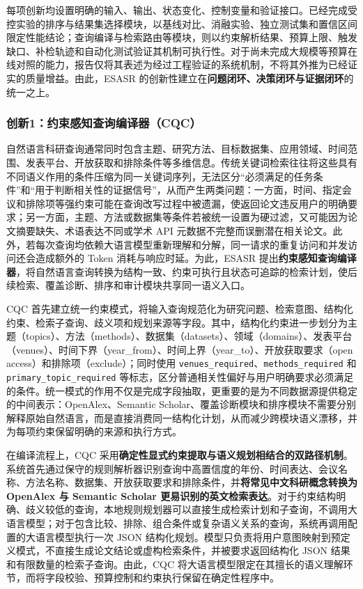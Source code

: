 \documentclass[a4paper,12pt,fontset=none]{ctexart}
\begin{document}
每项创新均设置明确的输入、输出、状态变化、控制变量和验证接口。已经完成受控实验的排序与结果集选择模块，以基线对比、消融实验、独立测试集和置信区间限定性能结论；查询编译与检索路由等模块，则以约束解析结果、预算上限、触发缺口、补检轨迹和自动化测试验证其机制可执行性。对于尚未完成大规模等预算在线对照的能力，报告仅将其表述为经过工程验证的系统机制，不将其外推为已经证实的质量增益。由此，ESASR 的创新性建立在\textbf{问题闭环、决策闭环与证据闭环}的统一之上。

\subsubsection{创新1：约束感知查询编译器（CQC）}

自然语言科研查询通常同时包含主题、研究方法、目标数据集、应用领域、时间范围、发表平台、开放获取和排除条件等多维信息。传统关键词检索往往将这些具有不同语义作用的条件压缩为同一关键词序列，无法区分“必须满足的任务条件”和“用于判断相关性的证据信号”，从而产生两类问题：一方面，时间、指定会议和排除项等强约束可能在查询改写过程中被遗漏，使返回论文违反用户的明确要求；另一方面，主题、方法或数据集等条件若被统一设置为硬过滤，又可能因为论文摘要缺失、术语表达不同或学术 API 元数据不完整而误删潜在相关论文。此外，若每次查询均依赖大语言模型重新理解和分解，同一请求的重复访问和并发访问还会造成额外的 Token 消耗与响应时延。为此，ESASR 提出\textbf{约束感知查询编译器}，将自然语言查询转换为结构一致、约束可执行且状态可追踪的检索计划，使后续检索、覆盖诊断、排序和审计模块共享同一语义入口。

CQC 首先建立统一约束模式，将输入查询规范化为研究问题、检索意图、结构化约束、检索子查询、歧义项和规划来源等字段。其中，结构化约束进一步划分为主题（topics）、方法（methods）、数据集（datasets）、领域（domains）、发表平台（venues）、时间下界（year\_from）、时间上界（year\_to）、开放获取要求（open access）和排除项（exclude）；同时使用 \texttt{venues\_required}、\texttt{methods\_required} 和 \texttt{primary\_topic\_required} 等标志，区分普通相关性偏好与用户明确要求必须满足的条件。统一模式的作用不仅是完成字段抽取，更重要的是为不同数据源提供稳定的中间表示：OpenAlex、Semantic Scholar、覆盖诊断模块和排序模块不需要分别解释原始自然语言，而是直接消费同一结构化计划，从而减少跨模块语义漂移，并为每项约束保留明确的来源和执行方式。

在编译流程上，CQC 采用\textbf{确定性显式约束提取与语义规划相结合的双路径机制}。系统首先通过保守的规则解析器识别查询中高置信度的年份、时间表达、会议名称、方法名称、数据集、开放获取要求和排除条件，并\textbf{将常见中文科研概念转换为 OpenAlex 与 Semantic Scholar 更易识别的英文检索表达}。对于约束结构明确、歧义较低的查询，本地规则规划器可以直接生成检索计划和子查询，不调用大语言模型；对于包含比较、排除、组合条件或复杂语义关系的查询，系统再调用配置的大语言模型执行一次 JSON 结构化规划。模型只负责将用户意图映射到预定义模式，不直接生成论文结论或虚构检索条件，并被要求返回结构化 JSON 结果和有限数量的检索子查询。由此，CQC 将大语言模型限定在其擅长的语义理解环节，而将字段校验、预算控制和约束执行保留在确定性程序中。
\end{document}
